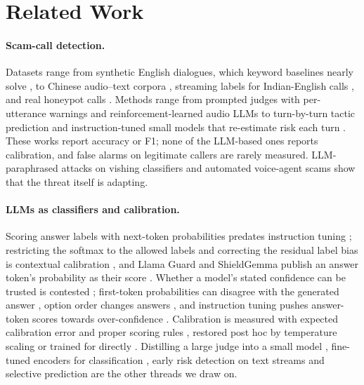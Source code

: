 \documentclass[11pt]{article}
\begin{document}
\section{Related Work}
\label{sec:related}

\paragraph{Scam-call detection.} Datasets range from synthetic English dialogues, which keyword baselines nearly solve \citep{shen2024combating}, to Chinese audio--text corpora \citep{teleantifraud2025,wang2026safeqaq}, streaming labels for Indian-English calls \citep{icfd2026}, and real honeypot calls \citep{anatomy2026}. Methods range from prompted judges with per-utterance warnings \citep{shen2025warned} and reinforcement-learned audio LLMs \citep{wang2026safeqaq} to turn-by-turn tactic prediction \citep{vishingtactics2026} and instruction-tuned small models that re-estimate risk each turn \citep{ghafariasl2026elder}. These works report accuracy or F1; none of the LLM-based ones reports calibration, and false alarms on legitimate callers are rarely measured. LLM-paraphrased attacks on vishing classifiers \citep{li2025phisher} and automated voice-agent scams \citep{fang2024voiceagents} show that the threat itself is adapting.

\paragraph{LLMs as classifiers and calibration.} Scoring answer labels with next-token probabilities predates instruction tuning \citep{brown2020gpt3,schick2021pet,robinson2023mcq}; restricting the softmax to the allowed labels and correcting the residual label bias is contextual calibration \citep{zhao2021calibrate,holtzman2021surface}, and Llama Guard and ShieldGemma publish an answer token's probability as their score \citep{inan2023llamaguard,zeng2024shieldgemma}. Whether a model's stated confidence can be trusted is contested \citep{tian2023justask,xiong2024uncertainty,kadavath2022}; first-token probabilities can disagree with the generated answer \citep{wang2024myanswerisc}, option order changes answers \citep{zheng2024mcq,pezeshkpour2024order}, and instruction tuning pushes answer-token scores towards over-confidence \citep{cruz2024letters}. Calibration is measured with expected calibration error \citep{naeini2015ece,nixon2019measuring} and proper scoring rules \citep{brier1950,gneiting2007proper}, restored post hoc by temperature scaling \citep{guo2017calibration} or trained for directly \citep{lin2022words,stangel2025rewardingdoubt,conftuner2025}. Distilling a large judge into a small model \citep{kim2024prometheus,hsieh2023distilling}, fine-tuned encoders for classification \citep{warner2024modernbert,ettin2025}, early risk detection on text streams \citep{losada2016erisk} and selective prediction \citep{geifman2017selective} are the other threads we draw on.
\end{document}
